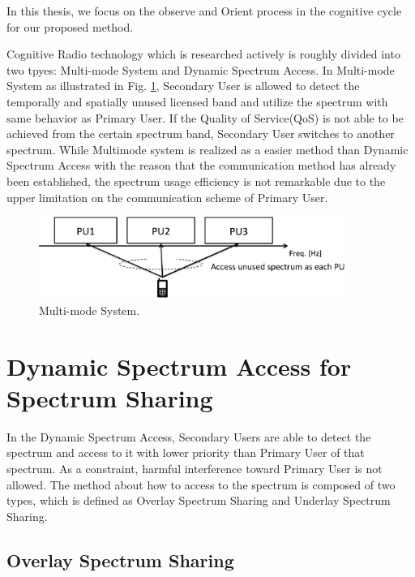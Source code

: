 In this thesis, we focus on the observe and Orient process in the cognitive cycle for our proposed method.


Cognitive Radio technology which is researched actively is roughly divided into two tpyes: Multi-mode System and Dynamic Spectrum Access. In Multi-mode System as illustrated in Fig. \ref{fig:hetero}, Secondary User is allowed to detect the temporally and spatially unused licensed band and utilize the spectrum with same behavior as Primary User. If the Quality of Service(QoS) is not able to be achieved from the certain spectrum band, Secondary User switches to another spectrum. While Multimode system is realized as a easier method than Dynamic Spectrum Access with the reason that the communication method has already been established, the spectrum usage efficiency is not remarkable due to the upper limitation on the communication scheme of Primary User.

\begin{figure}[!htp]
\begin{center}
\includegraphics[width=100mm,clip]{multimode.eps}
\caption{Multi-mode System.}
\label{fig:hetero}
\end{center}
\end{figure}

\section{Dynamic Spectrum Access for Spectrum Sharing}
In the Dynamic Spectrum Access, Secondary Users are able to detect the spectrum and access to it with lower priority than Primary User of that spectrum. As a constraint, harmful interference toward Primary User is not allowed. The method about how to access to the spectrum is composed of two types, which is defined as Overlay Spectrum Sharing \cite{ref:overlay}and Underlay Spectrum Sharing\cite{ref:underlay}.

\subsection{Overlay Spectrum Sharing}

